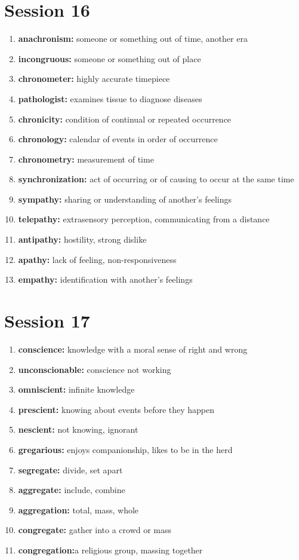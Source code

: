 \documentclass{article}
\begin{document}
\section{Session 16}
\begin{enumerate}
    \item \textbf{anachronism: }{someone or something out of time, another era}
    \item \textbf{incongruous: }{someone or something out of place}
    \item \textbf{chronometer: }{highly accurate timepiece}
    \item \textbf{pathologist: }{examines tissue to diagnose diseases}
    \item \textbf{chronicity: }{condition of continual or repeated occurrence}
    \item \textbf{chronology: }{calendar of events in order of occurrence}
    \item \textbf{chronometry: }{measurement of time}
    \item \textbf{synchronization: }{act of occurring or of causing to occur at the same time}
    \item \textbf{sympathy: }{sharing or understanding of another's feelings}
    \item \textbf{telepathy: }{extrasensory perception, communicating from a distance}
    \item \textbf{antipathy: }{hostility, strong dislike}
    \item \textbf{apathy: }{lack of feeling, non-responsiveness}
    \item \textbf{empathy: }{identification with another's feelings}
    
\end{enumerate}

\section{Session 17}
\begin{enumerate}
    \item \textbf{conscience: }{knowledge with a moral sense of right and wrong}
    \item \textbf{unconscionable: }{conscience not working}
    \item \textbf{omniscient: }{infinite knowledge}
    \item \textbf{prescient: }{knowing about events before they happen}
    \item \textbf{nescient: }{not knowing, ignorant}
    \item \textbf{gregarious: }{enjoys companionship, likes to be in the herd}
    \item \textbf{segregate: }{divide, set apart}
    \item \textbf{aggregate: }{include, combine}
    \item \textbf{aggregation: }{total, mass, whole}
    \item \textbf{congregate: }{gather into a crowd or mass}
    \item \textbf{congregation:}{a religious group, massing together}
\end{enumerate}
\end{document}
